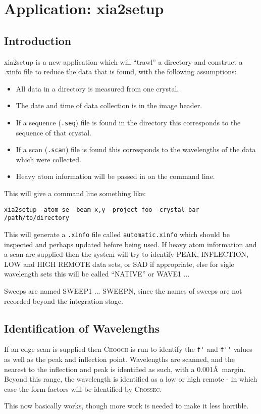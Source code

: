 \documentclass[a4paper, 11pt]{article}
\begin{document}
\section{Application: xia2setup}
\subsection{Introduction}

xia2setup is a new application which will ``trawl'' a directory and construct
a .xinfo file to reduce the data that is found, with the following assumptions:

\begin{itemize}
\item{All data in a directory is measured from one crystal.}
\item{The date and time of data collection is in the image header.}
\item{If a sequence (\verb|.seq|) file is found in the directory this
corresponds to the sequence of that crystal.}
\item{If a scan (\verb|.scan|) file is found this corresponds to the
wavelengths of the data which were collected.}
\item{Heavy atom information will be passed in on the command line.}
\end{itemize}

This will give a command line something like:

\begin{verbatim}
xia2setup -atom se -beam x,y -project foo -crystal bar /path/to/directory
\end{verbatim}

This will generate a \verb|.xinfo| file called \verb|automatic.xinfo|
which should be inspected and perhaps updated before being used. If heavy
atom information and a scan are supplied then the system will try to identify 
PEAK, INFLECTION, LOW and HIGH REMOTE data sets, or SAD if appropriate, else 
for sigle wavelength sets this will be called ``NATIVE'' or WAVE1 ...

Sweeps are named SWEEP1 ... SWEEPN, since the names of sweeps are not recorded
beyond the integration stage.

\subsection{Identification of Wavelengths}

If an edge scan is supplied then \textsc{Chooch} is run to identify the 
\verb|f'| and \verb|f''| values as well as the peak and inflection point.
Wavelengths are scanned, and the nearest to the inflection and peak is 
identified as such, with a 0.001\AA\ margin. Beyond this range, the wavelength
is identified as a low or high remote - in which case the form factors will
be identified by \textsc{Crossec}.

This now basically works, though more work is needed to make it less
horrible.
\end{document}
